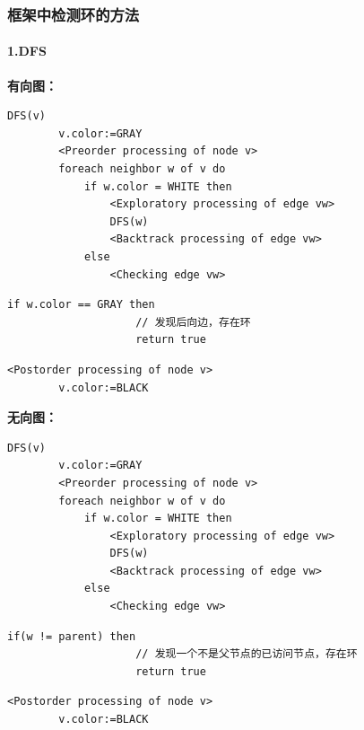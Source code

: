 \documentclass{article}
\begin{document}
\subsubsection{框架中检测环的方法}

\paragraph{1.DFS\\}
\textbf{有向图：\\}

\begin{lstlisting}[style=algorithmPPT]
    DFS(v)
        v.color:=GRAY
        <Preorder processing of node v>
        foreach neighbor w of v do
            if w.color = WHITE then
                <Exploratory processing of edge vw>
                DFS(w)
                <Backtrack processing of edge vw>              
            else
                <Checking edge vw>
        \end{lstlisting}  

\begin{lstlisting}[style=algorithm]
                if w.color == GRAY then
                    // 发现后向边，存在环
                    return true
            \end{lstlisting}

\begin{lstlisting}[style=algorithmPPT]
        <Postorder processing of node v>
        v.color:=BLACK
    \end{lstlisting}

\textbf{无向图：\\}
\begin{lstlisting}[style=algorithmPPT]
    DFS(v)
        v.color:=GRAY
        <Preorder processing of node v>
        foreach neighbor w of v do
            if w.color = WHITE then
                <Exploratory processing of edge vw>
                DFS(w)
                <Backtrack processing of edge vw>              
            else
                <Checking edge vw>
        \end{lstlisting}  

\begin{lstlisting}[style=algorithm]
                if(w != parent) then
                    // 发现一个不是父节点的已访问节点，存在环
                    return true
            \end{lstlisting}

\begin{lstlisting}[style=algorithmPPT]
        <Postorder processing of node v>
        v.color:=BLACK
    \end{lstlisting}
\end{document}
